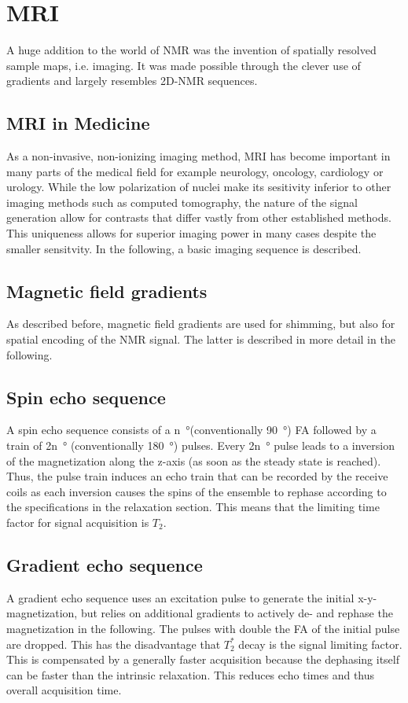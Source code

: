     \section{MRI}
    \label{theory:section:MRI}
        A huge addition to the world of NMR was the invention of spatially resolved sample maps, i.e. imaging. It was made possible through the clever use of gradients and largely resembles 2D-NMR sequences.
        \subsection{MRI in Medicine}
            As a non-invasive, non-ionizing imaging method, MRI has become important in many parts of the medical field for example neurology, oncology, cardiology or urology. While the low polarization of nuclei make its sesitivity inferior to other imaging methods such as computed tomography, the nature of the signal generation allow for contrasts that differ vastly from other established methods. This uniqueness allows for superior imaging power in many cases despite the smaller sensitvity. In the following, a basic imaging sequence is described.
        \subsection{Magnetic field gradients}
            As described before, magnetic field gradients are used for shimming, but also for spatial encoding of the NMR signal. The latter is described in more detail in the following.
        \subsection{Spin echo sequence}
        A spin echo sequence consists of a n\SI{}{\degree}(conventionally \SI{90}{\degree}) FA followed by a train of 2n\SI{}{\degree} (conventionally \SI{180}{\degree}) pulses. Every 2n\SI{}{\degree} pulse leads to a inversion of the magnetization along the z-axis (as soon as the steady state is reached). Thus, the pulse train induces an echo train that can be recorded by the receive coils as each inversion causes the spins of the ensemble to rephase according to the specifications in the relaxation section. This means that the limiting time factor for signal acquisition is $T_2$.
        \subsection{Gradient echo sequence}
        A gradient echo sequence uses an excitation pulse to generate the initial x-y-magnetization, but relies on additional gradients to actively de- and rephase the magnetization in the following. The pulses with double the FA of the initial pulse are dropped. This has the disadvantage that $T_2^*$ decay is the signal limiting factor. This is compensated by a generally faster acquisition because the dephasing itself can be faster than the intrinsic relaxation. This reduces echo times and thus overall acquisition time.
